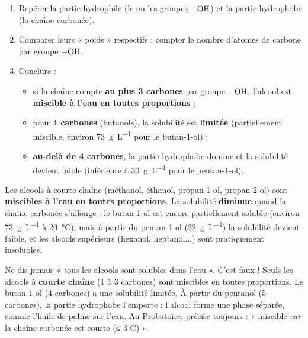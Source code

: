 \documentclass[11pt]{article}
\newcommand{\cle}[1]{{\popxbold\color{popdark}#1}}
\begin{document}
\begin{methode}
\begin{enumerate}
\item Repérer la partie hydrophile (le ou les groupes $-\ce{OH}$) et la partie hydrophobe (la chaîne carbonée).
\item Comparer leurs « poids » respectifs : compter le nombre d'atomes de carbone par groupe $-\ce{OH}$.
\item Conclure : 
\begin{itemize}
\item si la chaîne compte \textbf{au plus 3 carbones} par groupe $-\ce{OH}$, l'alcool est \textbf{miscible à l'eau en toutes proportions} ;
\item pour \textbf{4 carbones} (butanols), la solubilité est \textbf{limitée} (partiellement miscible, environ \SI{73}{g.L^{-1}} pour le butan-1-ol) ;
\item \textbf{au-delà de 4 carbones}, la partie hydrophobe domine et la solubilité devient faible (inférieure à \SI{30}{g.L^{-1}} pour le pentan-1-ol).
\end{itemize}
\end{enumerate}
\end{methode}

\begin{propriete}
Les alcools à courte chaîne (\cle{méthanol}, \cle{éthanol}, \cle{propan-1-ol}, \cle{propan-2-ol}) sont \textbf{miscibles à l'eau en toutes proportions}. La solubilité \textbf{diminue} quand la chaîne carbonée s'allonge : le butan-1-ol est encore partiellement soluble (environ \SI{73}{g.L^{-1}} à \SI{20}{\celsius}), mais à partir du pentan-1-ol (\SI{22}{g.L^{-1}}) la solubilité devient faible, et les alcools supérieurs (hexanol, heptanol...) sont pratiquement insolubles.
\end{propriete}

\begin{attention}
Ne dis jamais « tous les alcools sont solubles dans l'eau ». C'est faux ! Seuls les alcools à \textbf{courte chaîne} (1 à 3 carbones) sont miscibles en toutes proportions. Le butan-1-ol (4 carbones) a une solubilité limitée. À partir du \cle{pentanol} (5 carbones), la partie hydrophobe l'emporte : l'alcool forme une phase séparée, comme l'huile de palme sur l'eau. Au Probatoire, précise toujours : « miscible \emph{car} la chaîne carbonée est courte (≤ 3 C) ».
\end{attention}
\end{document}
